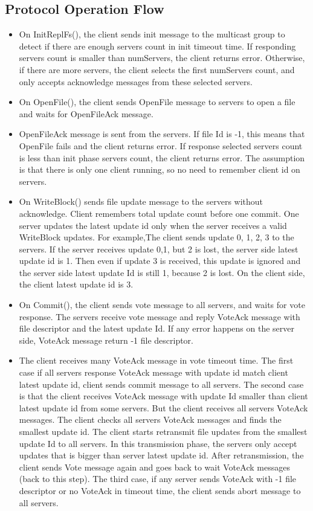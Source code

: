 \documentclass[12pt,fleqn]{article}
\begin{document}
\subsection{Protocol Operation Flow}
\begin{itemize}
	\item On InitReplFs(), the client sends init message to the multicast group to detect if there are enough servers count in init timeout time. If responding servers count is smaller than numServers, the client returns error. Otherwise, if there are more servers, the client selects the first numServers count, and only accepts acknowledge messages from these selected servers.
	\item On OpenFile(), the client sends OpenFile message to servers to open a file and waits for OpenFileAck message.
	\item OpenFileAck message is sent from the servers. If file Id is -1, this means that OpenFile fails and the client returns error. If response selected servers count is less than init phase servers count, the client returns error. The assumption is that there is only one client running, so no need to remember client id on servers.
	\item On WriteBlock() sends file update message to the servers without acknowledge. Client remembers total update count before one commit. One server updates the latest update id only when the server receives a valid WriteBlock updates. For example,The client sends update 0, 1, 2, 3 to the servers. If the server receives update 0,1, but 2 is lost, the server side latest update id is 1. Then even if update 3 is received, this update is ignored and the server side latest update Id is still 1, because 2 is lost. On the client side, the client latest update id is 3.
	\item On Commit(), the client sends vote message to all servers, and waits for vote response. The servers receive vote message and reply VoteAck message with file descriptor and the latest update Id. If any error happens on the server side, VoteAck message return -1 file descriptor.
	\item The client receives many VoteAck message in vote timeout time. The first case if all servers response VoteAck message with update id match client latest update id, client sends commit message to all servers. The second case is that the client receives VoteAck message with update Id smaller than client latest update id from some servers. But the client receives all servers VoteAck messages. The client checks all servers VoteAck messages and finds the smallest update id. The client starts retransmit file updates from the smallest update Id to all servers. In this transmission phase, the servers only accept updates that is bigger than server latest update id. After retransmission, the client sends Vote message again and goes back to wait VoteAck messages (back to this step). The third case, if any server sends VoteAck with -1 file descriptor or no VoteAck in timeout time, the client sends abort message to all servers.

\end{itemize}
\end{document}
